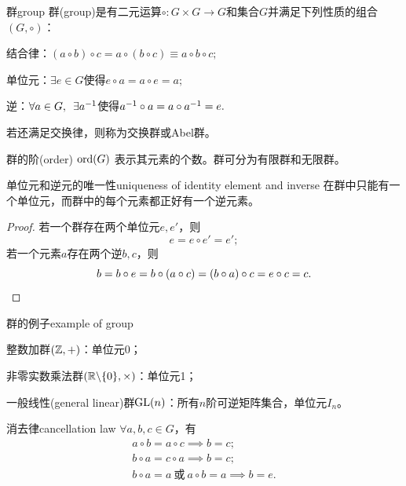\begin{definition}{群}{group}
	群(group)是有二元运算$\circ :G \times G \to G$和集合$G$并满足下列性质的组合$(G, \circ)$：
	\begin{compactitem}
		\item 结合律：$(a \circ b) \circ c = a \circ (b \circ c) \equiv a \circ b \circ c;$
		\item 单位元：$\exists e \in G$使得$e \circ a = a \circ e = a;$
		\item 逆：$\forall a \in G,\enspace\exists a^{-1}$使得$a^{-1} \circ a = a \circ a^{-1} = e.$
	\end{compactitem}
	若还满足交换律，则称为交换群或Abel群。

	\tcblower
	群的阶(order) $\operatorname{ord}(G)$ 表示其元素的个数。群可分为有限群和无限群。
\end{definition}
\begin{theorem}{单位元和逆元的唯一性}{uniqueness of identity element and inverse}
	在群中只能有一个单位元，而群中的每个元素都正好有一个逆元素。
\end{theorem}
\begin{proof}
	若一个群存在两个单位元$e,e'$，则 
	\[
		e = e \circ e' = e';
	\]
	若一个元素$a$存在两个逆$b,c$，则 
	\[
		b = b \circ e = b \circ (a \circ c) = (b \circ a) \circ c = e \circ c = c.
		\qedhere
	\]
\end{proof}
\begin{example}{群的例子}{example of group}
	\begin{compactitem}
		\item 整数加群$(\mathbb{Z},+)$：单位元0；
		\item 非零实数乘法群$(\mathbb{R}\backslash\{0\}, \times)$：单位元1；
		\item 一般线性(general linear)群$\operatorname{GL}(n)$：所有$n$阶可逆矩阵集合，单位元$I_n$。
	\end{compactitem}
\end{example}
\begin{theorem}{消去律}{cancellation law}
	$\forall a,b,c \in G$，有
	\begin{subequations}
		\begin{gather}
			a \circ b = a \circ c \implies b = c;\\
			b \circ a = c \circ a \implies b = c;\\
			b \circ a = a~\text{或}~a \circ b = a \implies b = e.
		\end{gather}
	\end{subequations}
\end{theorem}
